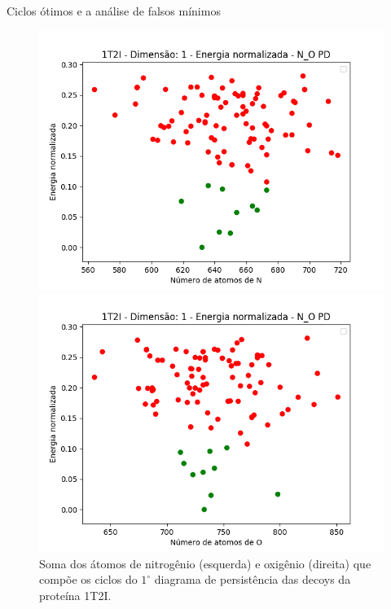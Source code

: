 \documentclass[10pt]{beamer}
\begin{document}
\begin{frame}{Ciclos ótimos e a análise de falsos mínimos}
    \begin{figure}
        \centering
        \begin{minipage}{0.45\textwidth}
            \centering
            \includegraphics[width=1.1\textwidth]{images/cyc1t2iN.png} %
        \end{minipage}\hfill
        \begin{minipage}{0.45\textwidth}
            \centering
            \includegraphics[width=1.1\textwidth]{images/cyc1t2iO.png} %
        \end{minipage}
        \caption{Soma dos átomos de nitrogênio (esquerda) e oxigênio (direita) que compõe os ciclos do 
        $1^\circ$ diagrama de persistência das decoys da proteína 1T2I.}
    \end{figure}
\end{frame}
\end{document}
